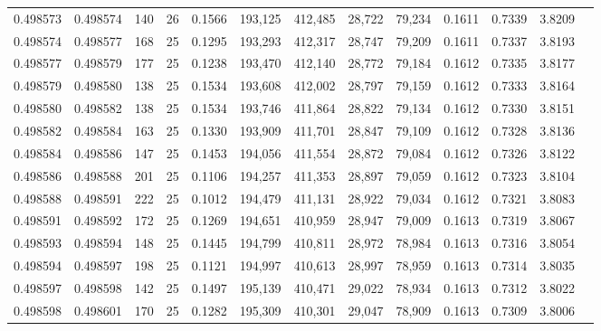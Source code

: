 \begin{tabular}{rrrrrrrrrrrrr}
0.498573 & 0.498574 & 140 &  26 &                                     0.1566 & 193,125 & 412,485 &  28,722 &  79,234 & 0.1611 & 0.7339 & 3.8209 \\
0.498574 & 0.498577 & 168 &  25 &                                     0.1295 & 193,293 & 412,317 &  28,747 &  79,209 & 0.1611 & 0.7337 & 3.8193 \\
0.498577 & 0.498579 & 177 &  25 &                                     0.1238 & 193,470 & 412,140 &  28,772 &  79,184 & 0.1612 & 0.7335 & 3.8177 \\
0.498579 & 0.498580 & 138 &  25 &                                     0.1534 & 193,608 & 412,002 &  28,797 &  79,159 & 0.1612 & 0.7333 & 3.8164 \\
0.498580 & 0.498582 & 138 &  25 &                                     0.1534 & 193,746 & 411,864 &  28,822 &  79,134 & 0.1612 & 0.7330 & 3.8151 \\
0.498582 & 0.498584 & 163 &  25 &                                     0.1330 & 193,909 & 411,701 &  28,847 &  79,109 & 0.1612 & 0.7328 & 3.8136 \\
0.498584 & 0.498586 & 147 &  25 &                                     0.1453 & 194,056 & 411,554 &  28,872 &  79,084 & 0.1612 & 0.7326 & 3.8122 \\
0.498586 & 0.498588 & 201 &  25 &                                     0.1106 & 194,257 & 411,353 &  28,897 &  79,059 & 0.1612 & 0.7323 & 3.8104 \\
0.498588 & 0.498591 & 222 &  25 &                                     0.1012 & 194,479 & 411,131 &  28,922 &  79,034 & 0.1612 & 0.7321 & 3.8083 \\
0.498591 & 0.498592 & 172 &  25 &                                     0.1269 & 194,651 & 410,959 &  28,947 &  79,009 & 0.1613 & 0.7319 & 3.8067 \\
0.498593 & 0.498594 & 148 &  25 &                                     0.1445 & 194,799 & 410,811 &  28,972 &  78,984 & 0.1613 & 0.7316 & 3.8054 \\
0.498594 & 0.498597 & 198 &  25 &                                     0.1121 & 194,997 & 410,613 &  28,997 &  78,959 & 0.1613 & 0.7314 & 3.8035 \\
0.498597 & 0.498598 & 142 &  25 &                                     0.1497 & 195,139 & 410,471 &  29,022 &  78,934 & 0.1613 & 0.7312 & 3.8022 \\
0.498598 & 0.498601 & 170 &  25 &                                     0.1282 & 195,309 & 410,301 &  29,047 &  78,909 & 0.1613 & 0.7309 & 3.8006 \\

\end{tabular}
